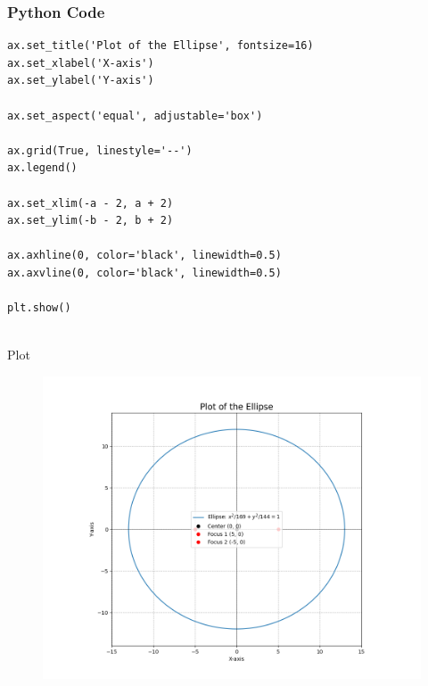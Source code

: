 \documentclass{beamer}
\begin{document}
\begin{frame}[fragile]
    \frametitle{Python Code}
    \begin{lstlisting}
ax.set_title('Plot of the Ellipse', fontsize=16)
ax.set_xlabel('X-axis')
ax.set_ylabel('Y-axis')

ax.set_aspect('equal', adjustable='box')

ax.grid(True, linestyle='--')
ax.legend()

ax.set_xlim(-a - 2, a + 2)
ax.set_ylim(-b - 2, b + 2)

ax.axhline(0, color='black', linewidth=0.5)
ax.axvline(0, color='black', linewidth=0.5)

plt.show()
   
    \end{lstlisting}
\end{frame}


\begin{frame}{Plot}

    
    \begin{figure}[h!]
\begin{center}
\includegraphics[width=\columnwidth]{figs/fig3.png}
\end{center}
\label{fig:Fig.1}
\end{figure}
    
\end{frame}    
    
  
\end{document}
